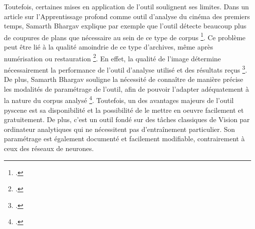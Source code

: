 Toutefois, certaines mises en application de l'outil soulignent ses limites. Dans un article sur l'\gls{Apprentissage profond} comme outil d'analyse du cinéma des premiers temps, Samarth Bhargav explique par exemple que l'outil détecte beaucoup plus de coupures de \gls{plan}s que nécessaire au sein de ce type de corpus \footcite{bhargav2019}. Ce problème peut être lié à la qualité amoindrie de ce type d'archives, même après numérisation ou restauration \footcite{bhargav2019}. En effet, la qualité de l'image détermine nécessairement la performance de l'outil d'analyse utilisé et des résultats reçus \footcite{norindr2023}. De plus, Samarth Bhargav souligne la nécessité de connaître de manière précise les modalités de paramétrage de l'outil, afin de pouvoir l'adapter adéquatement à la nature du corpus analysé \footcite{bhargav2019}. Toutefois, un des avantages majeurs de l'outil \gls{pyscene} est sa disponibilité et la possibilité de le mettre en oeuvre facilement et gratuitement. De plus, c'est un outil fondé sur des tâches classiques de \gls{Vision par ordinateur} analytiques qui ne nécessitent pas d'entraînement particulier. Son paramétrage est également documenté et facilement modifiable, contrairement à ceux des réseaux de neurones. 
